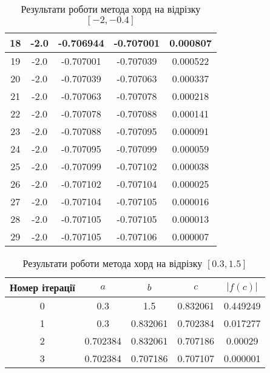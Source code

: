 \begin{table}[h!]
\begin{tabular}{|c|c|c|c|c|}
        \hline
        18 & -2.0 & -0.706944 & -0.707001 & 0.000807 \\
        \hline
        19 & -2.0 & -0.707001 & -0.707039 & 0.000522 \\
        \hline
        20 & -2.0 & -0.707039 & -0.707063 & 0.000337 \\
        \hline
        21 & -2.0 & -0.707063 & -0.707078 & 0.000218 \\
        \hline
        22 & -2.0 & -0.707078 & -0.707088 & 0.000141 \\
        \hline
        23 & -2.0 & -0.707088 & -0.707095 & 0.000091 \\
        \hline
        24 & -2.0 & -0.707095 & -0.707099 & 0.000059 \\
        \hline
        25 & -2.0 & -0.707099 & -0.707102 & 0.000038 \\
        \hline
        26 & -2.0 & -0.707102 & -0.707104 & 0.000025 \\
        \hline
        27 & -2.0 & -0.707104 & -0.707105 & 0.000016 \\
        \hline
        28 & -2.0 & -0.707105 & -0.707105 & 0.000013 \\
        \hline
        29 & -2.0 & -0.707105 & -0.707106 & 0.000007 \\
        \hline
    \end{tabular}
    \caption{Результати роботи метода хорд на відрізку $[-2, -0.4]$}
\end{table}

\begin{table}[h!]
    \centering
    \begin{tabular}{|c|c|c|c|c|}
        \hline
        \textbf{Номер ітерації} & $a$ & $b$ & $c$ & $|f(c)|$ \\
        \hline
        0 & 0.3 & 1.5 & 0.832061 & 0.449249 \\
        \hline
        1 & 0.3 & 0.832061 & 0.702384 & 0.017277 \\
        \hline
        2 & 0.702384 & 0.832061 & 0.707186 & 0.00029 \\
        \hline
        3 & 0.702384 & 0.707186 & 0.707107 & 0.000001 \\
        \hline
    \end{tabular}
    \caption{Результати роботи метода хорд на відрізку $[0.3, 1.5]$}
\end{table}

